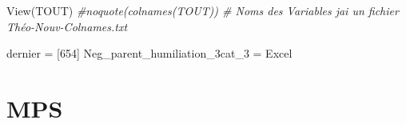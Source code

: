 \documentclass[
]{article}
\newenvironment{Shaded}{\begin{snugshade}}{\end{snugshade}}
\newcommand{\CommentTok}[1]{\textcolor[rgb]{0.56,0.35,0.01}{\textit{#1}}}
\newcommand{\ControlFlowTok}[1]{\textcolor[rgb]{0.13,0.29,0.53}{\textbf{#1}}}
\newcommand{\DecValTok}[1]{\textcolor[rgb]{0.00,0.00,0.81}{#1}}
\newcommand{\FunctionTok}[1]{\textcolor[rgb]{0.00,0.00,0.00}{#1}}
\newcommand{\NormalTok}[1]{#1}
\newcommand{\OtherTok}[1]{\textcolor[rgb]{0.56,0.35,0.01}{#1}}
\newcommand{\SpecialCharTok}[1]{\textcolor[rgb]{0.00,0.00,0.00}{#1}}
\newcommand{\StringTok}[1]{\textcolor[rgb]{0.31,0.60,0.02}{#1}}
\begin{document}
\begin{Shaded}
\begin{Highlighting}[]
\FunctionTok{View}\NormalTok{(TOUT)}
\CommentTok{\#noquote(colnames(TOUT))   \# Noms des Variables j\textquotesingle{}ai un fichier Théo{-}Nouv{-}Colnames.txt}
\end{Highlighting}
\end{Shaded}

dernier = {[}654{]} Neg\_parent\_humiliation\_3cat\_3 = Excel

\hypertarget{mps}{%
\section{MPS}\label{mps}}

\begin{Shaded}
\end{Shaded}
\end{document}

